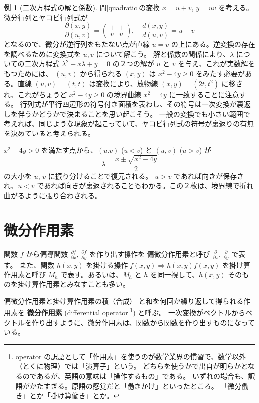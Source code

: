 \documentclass[a4paper]{jsarticle}
\theoremstyle{definition}
\newtheorem{Example}[Theorem]{例}
\theoremstyle{remark}
\newcommand{\del}{\partial}
\begin{document}
\begin{Example}[二次方程式の解と係数]
  問\ref{quadratic}の変換 $x = u+v$, $y = uv$ を考える。微分行列とヤコビ行列式が
  \[
    \frac{\partial(x,y)}{\partial(u,v)} =
    \begin{pmatrix}
      1 & 1\\
      v & u
    \end{pmatrix},
    \quad
    \frac{d(x,y)}{d(u,v)} = u-v
  \]
  となるので、微分が逆行列をもたない点が直線 $u=v$ の上にある。逆変換の存在を調べるために変換式を $u,v$ について解こう。
  解と係数の関係により、$\lambda$ についての二次方程式 $\lambda^2 - x\lambda + y = 0$ の２つの解が $u$ と $v$ を与え、これが実数解をもつためには、
  $(u,v)$ から得られる $(x,y)$ は $x^2 - 4y \geq 0$ をみたす必要がある。直線 $(u,v) = (t,t)$ は変換により、放物線
  $(x,y) = (2t,t^2)$ に移され、これがちょうど $x^2 - 4y \geq 0$ の境界曲線 $x^2 = 4y$ に一致することに注意する。
  行列式が平行四辺形の符号付き面積を表わし、その符号は一次変換が裏返しを伴うかどうかで決まることを思い起こそう。
  一般の変換でも小さい範囲で考えれば、同じような現象が起こっていて、ヤコビ行列式の符号が裏返りの有無を決めていると考えられる。

  $x^2 - 4y > 0$ を満たす点から、$(u.v)$ ($u<v$) と $(u,v)$ ($u > v$) が
  \[
\lambda = \frac{x \pm \sqrt{x^2-4y}}{2}
  \]
  の大小を $u$, $v$ に振り分けることで復元される。
  $u>v$ であれば向きが保存され、$u< v$ であれば向きが裏返されることもわかる。この２枚は、境界線で折れ曲がるように張り合わされる。
\end{Example}

\bigskip
\section{微分作用素}
関数 $f$ から偏導関数 
$\displaystyle \frac{\del f}{\del x}$, 
$\displaystyle \frac{\del f}{\del y}$ 
を作り出す操作を%
偏微分作用素と呼び $\displaystyle \frac{\del}{\del x}$, $\displaystyle \frac{\del}{\del y}$ で表す。
また、関数 $h(x,y)$ を掛ける操作 $f(x,y) \Longrightarrow h(x,y)f(x,y)$ を掛け算作用素と呼び 
$M_h$ で表す。あるいは、$M_h$ と $h$ を同一視して、$h(x,y)$ そのものを掛け算作用素とみなすことも多い。

偏微分作用素と掛け算作用素の積（合成）
と和を何回か繰り返して得られる作用素を 
{\bf 微分作用素} (differential operator
\footnote{operator の訳語として「作用素」を使うのが数学業界の慣習で、数学以外（とくに物理）では「演算子」という。
どちらを使うかで出自が明らかとなるのであるが、英語の意味は「操作するもの」である。
いずれの場合も、訳語がかたすぎる。原語の感覚だと「働きかけ」といったところ。
「微分働き」とか「掛け算働き」とか。
}) と呼ぶ。
一次変換がベクトルからベクトルを作り出すように、微分作用素は、関数から関数を作り出すものになっている。
\end{document}
